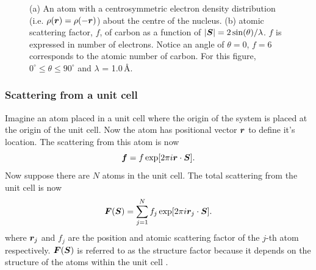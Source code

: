 \begin{figure}
\begin{subfigure}[b]{0.5\textwidth}
                        \caption{}
                        \label{fig:carbon atomic scattering factor}
                \end{subfigure}
                \caption[Centrosymmetric electron cloud and scattering factor from carbon]{(a) An atom with a centrosymmetric electron density distribution (i.e. $\rho(\boldsymbol{r}) = \rho(-\boldsymbol{r})$) about the centre of the nucleus.
                (b) atomic scattering factor, $f$, of carbon as a function of $|\boldsymbol{S}| = 2 \sin(\theta)/\lambda$.
                $f$ is expressed in number of electrons.
                Notice an angle of $\theta = 0$, $f=6$ corresponds to the atomic number of carbon.
                For this figure, $0^{\circ} \leq \theta \leq 90^{\circ}$ and $\lambda$ = 1.0$\,$\AA.}
        		\label{fig:Scattering from an atom}
            \end{figure}

        \subsubsection{Scattering from a unit cell}
        \label{subs:Scattering from a unit cell}
            Imagine an atom placed in a unit cell where the origin of the system is placed at the origin of the unit cell.
            Now the atom has positional vector $\boldsymbol{r}$ to define it's location.
            The scattering from this atom is now
            \begin{equation}
                \boldsymbol{f} = f \exp[2 \pi i \boldsymbol{r} \cdot \boldsymbol{S}].
            \end{equation}
            Now suppose there are $N$ atoms in the unit cell. The total scattering from the unit cell is now
            \begin{equation}
                \boldsymbol{F}(\boldsymbol{S}) = \sum_{j=1}^N f_j \exp[2 \pi i \boldsymbol{r}_j \cdot \boldsymbol{S}].
                \label{eq:structure factor equation - summation}
            \end{equation}
            where $\boldsymbol{r}_j$ and $f_j$ are the position and atomic scattering factor of the $j$-th atom respectively.
            $\boldsymbol{F}(\boldsymbol{S})$ is referred to as the structure factor because it depends on the structure of the atoms within the unit cell \cite{drenth2012}.

